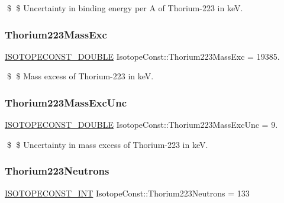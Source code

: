 \$ \$ Uncertainty in binding energy per A of Thorium-\/223 in keV. \mbox{\label{group___isotope_const-_thorium-_th223_ga47a8dc97b4048bcb9c7d54721f7f5571}} 
\subsubsection{\texorpdfstring{Thorium223\+Mass\+Exc}{Thorium223MassExc}}
{\footnotesize\ttfamily \mbox{\hyperlink{group___isotope_const-_macros_ga8f45a7272ce02c0b4c65c44636ed719a}{I\+S\+O\+T\+O\+P\+E\+C\+O\+N\+S\+T\+\_\+\+D\+O\+U\+B\+LE}} Isotope\+Const\+::\+Thorium223\+Mass\+Exc = 19385.}

\$ \$ Mass excess of Thorium-\/223 in keV. \mbox{\label{group___isotope_const-_thorium-_th223_ga15e18c7a147932aab783ac11b80fb360}} 
\subsubsection{\texorpdfstring{Thorium223\+Mass\+Exc\+Unc}{Thorium223MassExcUnc}}
{\footnotesize\ttfamily \mbox{\hyperlink{group___isotope_const-_macros_ga8f45a7272ce02c0b4c65c44636ed719a}{I\+S\+O\+T\+O\+P\+E\+C\+O\+N\+S\+T\+\_\+\+D\+O\+U\+B\+LE}} Isotope\+Const\+::\+Thorium223\+Mass\+Exc\+Unc = 9.}

\$ \$ Uncertainty in mass excess of Thorium-\/223 in keV. \mbox{\label{group___isotope_const-_thorium-_th223_ga1d17355da5dc3c03b68cd40a87198062}} 
\subsubsection{\texorpdfstring{Thorium223\+Neutrons}{Thorium223Neutrons}}
{\footnotesize\ttfamily \mbox{\hyperlink{group___isotope_const-_macros_ga5f18360b3e99483a35c32d789e62621c}{I\+S\+O\+T\+O\+P\+E\+C\+O\+N\+S\+T\+\_\+\+I\+NT}} Isotope\+Const\+::\+Thorium223\+Neutrons = 133}

